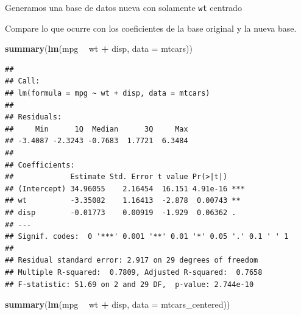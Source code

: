 \documentclass[
  12pt,
]{book}
\newenvironment{Shaded}{\begin{snugshade}}{\end{snugshade}}
\newcommand{\CommentTok}[1]{\textcolor[rgb]{0.56,0.35,0.01}{\textit{#1}}}
\newcommand{\DataTypeTok}[1]{\textcolor[rgb]{0.13,0.29,0.53}{#1}}
\newcommand{\KeywordTok}[1]{\textcolor[rgb]{0.13,0.29,0.53}{\textbf{#1}}}
\newcommand{\NormalTok}[1]{#1}
\newcommand{\OperatorTok}[1]{\textcolor[rgb]{0.81,0.36,0.00}{\textbf{#1}}}
\newcommand{\OtherTok}[1]{\textcolor[rgb]{0.56,0.35,0.01}{#1}}
\newcommand{\StringTok}[1]{\textcolor[rgb]{0.31,0.60,0.02}{#1}}
\theoremstyle{definition}
\theoremstyle{definition}
\theoremstyle{definition}
\theoremstyle{remark}
\begin{document}
Generamos una base de datos nueva con solamente \texttt{wt} centrado

\begin{Shaded}
\end{Shaded}

Compare lo que ocurre con los coeficientes de la base original y la nueva base.

\begin{Shaded}
\begin{Highlighting}[]
\KeywordTok{summary}\NormalTok{(}\KeywordTok{lm}\NormalTok{(mpg }\OperatorTok{~}\StringTok{ }\NormalTok{wt }\OperatorTok{+}\StringTok{ }\NormalTok{disp, }\DataTypeTok{data =}\NormalTok{ mtcars))}
\end{Highlighting}
\end{Shaded}

\begin{verbatim}
## 
## Call:
## lm(formula = mpg ~ wt + disp, data = mtcars)
## 
## Residuals:
##     Min      1Q  Median      3Q     Max 
## -3.4087 -2.3243 -0.7683  1.7721  6.3484 
## 
## Coefficients:
##             Estimate Std. Error t value Pr(>|t|)    
## (Intercept) 34.96055    2.16454  16.151 4.91e-16 ***
## wt          -3.35082    1.16413  -2.878  0.00743 ** 
## disp        -0.01773    0.00919  -1.929  0.06362 .  
## ---
## Signif. codes:  0 '***' 0.001 '**' 0.01 '*' 0.05 '.' 0.1 ' ' 1
## 
## Residual standard error: 2.917 on 29 degrees of freedom
## Multiple R-squared:  0.7809, Adjusted R-squared:  0.7658 
## F-statistic: 51.69 on 2 and 29 DF,  p-value: 2.744e-10
\end{verbatim}

\begin{Shaded}
\begin{Highlighting}[]
\KeywordTok{summary}\NormalTok{(}\KeywordTok{lm}\NormalTok{(mpg }\OperatorTok{~}\StringTok{ }\NormalTok{wt }\OperatorTok{+}\StringTok{ }\NormalTok{disp, }\DataTypeTok{data =}\NormalTok{ mtcars_centered))}
\end{Highlighting}
\end{Shaded}
\end{document}

